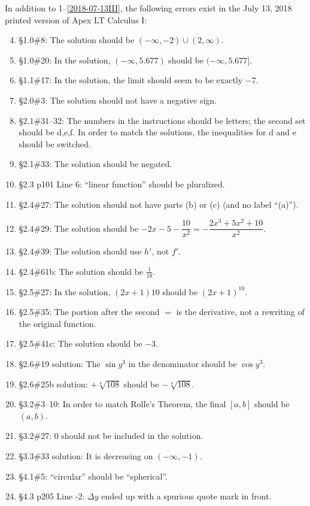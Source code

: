 \documentclass{amsart}
\begin{document}
In addition to 1--\ref{2018-07-13III}, the following errors exist in the July 13, 2018 printed version of Apex LT Calculus I:
\begin{enumerate}\setcounter{enumi}{3}
\item \S1.0\#8: The solution should be $(-\infty,-2)\cup(2,\infty)$.
\item \S1.0\#20: In the solution, $(-\infty,5.677)$ should be $(-\infty,5.677]$.
\item \S1.1\#17: In the solution, the limit should seem to be exactly $-7$.
\item \S2.0\#3: The solution should not have a negative sign.
\item \S2.1\#31--32: The numbers in the instructions should be letters; the second set should be d,e,f.  In order to match the solutions, the inequalities for d and e should be switched.
\item \S2.1\#33: The solution should be negated.
\item \S2.3 p101 Line 6: ``linear function'' should be pluralized.
\item \S2.4\#27: The solution should not have parts (b) or (c) (and no label ``(a)'').
\item \S2.4\#29: The solution should be $-2x-5-\dfrac{10}{x^2}=-\dfrac{2x^3+5x^2+10}{x^2}$.
\item \S2.4\#39: The solution should use $h'$, not $f'$.
\item \S2.4\#61b: The solution should be $\frac1{18}$.
\item \S2.5\#27: In the solution, $(2x+1)10$ should be $(2x+1)^{10}$.
\item \S2.5\#35: The portion after the second $=$ is the derivative, not a rewriting of the original function.
\item \S2.5\#41c: The solution should be $-3$.
\item \S2.6\#19 solution: The $\sin y^3$ in the denominator should be $\cos y^3$.
\item \S2.6\#25b solution: $+\sqrt[4]{108}$ should be $-\sqrt[4]{108}$.
\item \S3.2\#3--10: In order to match Rolle's Theorem, the final $[a,b]$ should be $(a,b)$.
\item \S3.2\#27: 0 should not be included in the solution.
\item \S3.3\#33 solution: It is decreasing on $(-\infty,-1)$.
\item \S4.1\#5: ``circular'' should be ``spherical''.
\item \S4.3 p205 Line -2: $\Delta y$ ended up with a spurious quote mark in front.

\end{enumerate}
\end{document}
